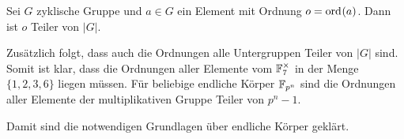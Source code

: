 \begin{satz}
    Sei $G$ zyklische Gruppe und $a \in G$ ein Element mit Ordnung $o = \ord{a}$. Dann ist $o$ Teiler von $|G|$.
\end{satz}

Zusätzlich folgt, dass auch die Ordnungen alle Untergruppen Teiler von $|G|$ sind. Somit ist klar, dass die Ordnungen aller Elemente vom $\field{7}^\times$ in der Menge $\{1,2,3,6\}$ liegen müssen. Für beliebige endliche Körper $\field{p}[n]$ sind die Ordnungen aller Elemente der multiplikativen Gruppe Teiler von $p^n-1$.

Damit sind die notwendigen Grundlagen über endliche Körper geklärt. 